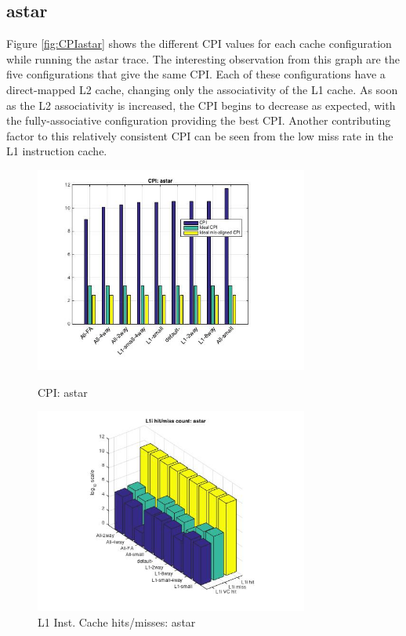 \documentclass[11pt,titlepage]{article}
\begin{document}
    \subsection{astar}
    Figure \ref{fig:CPIastar} shows the different CPI values for each cache configuration while running the astar trace. The interesting observation from this graph are the five configurations that give the same CPI. Each of these configurations have a direct-mapped L2 cache, changing only the associativity of the L1 cache. As soon as the L2 associativity is increased, the CPI begins to decrease as expected, with the fully-associative configuration providing the best CPI. Another contributing factor to this relatively consistent CPI can be seen from the low miss rate in the L1 instruction cache.
     \begin{figure}[H]
          \centering
          \begin{minipage}{.5\textwidth}
            \centering
            \includegraphics[width=9cm]{CPIastar}
            \caption{CPI: astar}
            \label{fig:CPIastar}
          \end{minipage}%
          \begin{minipage}{.5\textwidth}
            \includegraphics[width=9cm]{L1IHM_astar}
            \caption{L1 Inst. Cache hits/misses: astar}
            \label{fig:L1IHM_astar}
          \end{minipage}%
    \end{figure}
\end{document}
